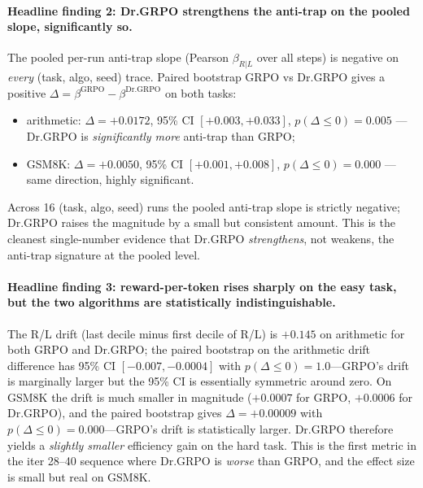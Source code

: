 \documentclass{article}
\begin{document}
\paragraph{Headline finding 2: Dr.GRPO strengthens the anti-trap on
the pooled slope, significantly so.}
The pooled per-run anti-trap slope (Pearson $\beta_{R|L}$ over all
steps) is negative on \emph{every} (task, algo, seed) trace.
Paired bootstrap GRPO vs Dr.GRPO gives a positive
$\Delta = \beta^{\mathrm{GRPO}} - \beta^{\mathrm{Dr.GRPO}}$ on both
tasks:
\begin{itemize}
  \item arithmetic: $\Delta = +0.0172$, 95\% CI $[+0.003, +0.033]$,
        $p(\Delta \le 0) = 0.005$ --- Dr.GRPO is \emph{significantly
        more} anti-trap than GRPO;
  \item GSM8K: $\Delta = +0.0050$, 95\% CI $[+0.001, +0.008]$,
        $p(\Delta \le 0) = 0.000$ --- same direction, highly
        significant.
\end{itemize}
Across 16 (task, algo, seed) runs the pooled anti-trap slope is
strictly negative; Dr.GRPO raises the magnitude by a small but
consistent amount.  This is the cleanest single-number evidence that
Dr.GRPO \emph{strengthens}, not weakens, the anti-trap signature at
the pooled level.

\paragraph{Headline finding 3: reward-per-token rises sharply on the
easy task, but the two algorithms are statistically
indistinguishable.}
The R/L drift (last decile minus first decile of R/L) is $+0.145$ on
arithmetic for both GRPO and Dr.GRPO; the paired bootstrap on the
arithmetic drift difference has 95\% CI $[-0.007, -0.0004]$ with
$p(\Delta \le 0) = 1.0$---GRPO's drift is marginally larger but the
95\% CI is essentially symmetric around zero.  On GSM8K the drift is
much smaller in magnitude ($+0.0007$ for GRPO, $+0.0006$ for
Dr.GRPO), and the paired bootstrap gives $\Delta = +0.00009$ with
$p(\Delta \le 0) = 0.000$---GRPO's drift is statistically larger.
Dr.GRPO therefore yields a \emph{slightly smaller} efficiency gain
on the hard task.  This is the first metric in the iter 28--40
sequence where Dr.GRPO is \emph{worse} than GRPO, and the effect
size is small but real on GSM8K.
\end{document}
